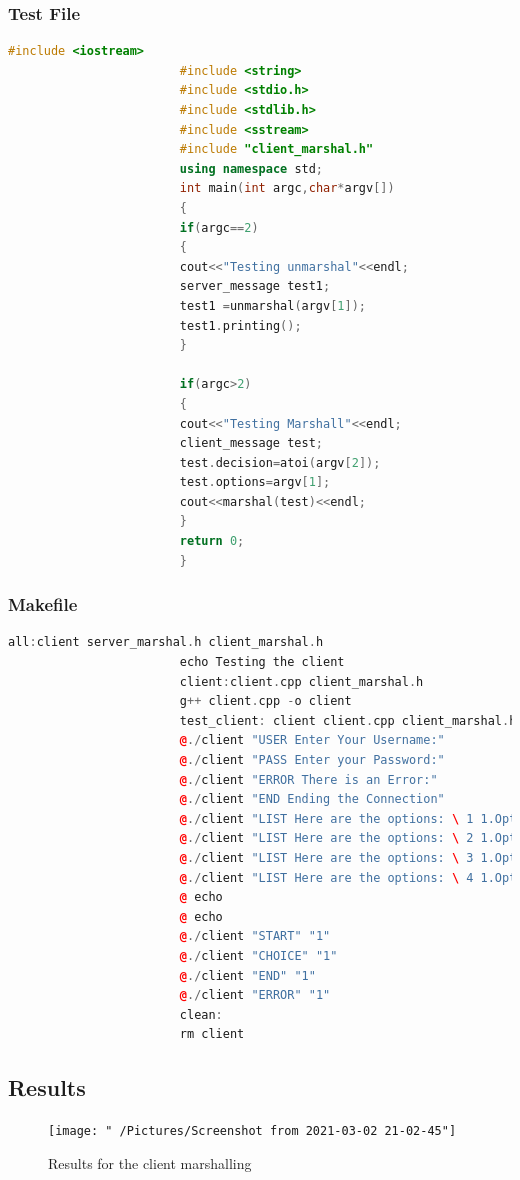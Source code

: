 \documentclass[11pt]{article}
\begin{document}
				\subsubsection{Test File}
					\begin{lstlisting}[language=C++]
						#include <iostream>
						#include <string>
						#include <stdio.h>
						#include <stdlib.h>
						#include <sstream>
						#include "client_marshal.h"
						using namespace std;
						int main(int argc,char*argv[])
						{
						if(argc==2)
						{
						cout<<"Testing unmarshal"<<endl;
						server_message test1;
						test1 =unmarshal(argv[1]);
						test1.printing();
						}
						
						if(argc>2)
						{
						cout<<"Testing Marshall"<<endl;
						client_message test;
						test.decision=atoi(argv[2]);
						test.options=argv[1];
						cout<<marshal(test)<<endl;
						}
						return 0;
						}
					\end{lstlisting}
				\subsubsection{Makefile}
					\begin{lstlisting}[language=C++]
						all:client server_marshal.h client_marshal.h
						echo Testing the client
						client:client.cpp client_marshal.h
						g++ client.cpp -o client				
						test_client: client client.cpp client_marshal.h
						@./client "USER Enter Your Username:"
						@./client "PASS Enter your Password:"
						@./client "ERROR There is an Error:"
						@./client "END Ending the Connection"
						@./client "LIST Here are the options: \ 1 1.Option 1 \\"
						@./client "LIST Here are the options: \ 2 1.Option 1 \ 2. Option 2 \\"
						@./client "LIST Here are the options: \ 3 1.Option 1 \ 2. Option 2 \ 3. Option 3 \\"
						@./client "LIST Here are the options: \ 4 1.Option 1 \ 2. Option 2 \ 3. Option 3 \ 4. Option 4 \\"
						@ echo
						@ echo
						@./client "START" "1"
						@./client "CHOICE" "1"
						@./client "END" "1"
						@./client "ERROR" "1"
						clean:
						rm client
					\end{lstlisting}
				\subsection{Results}	
					\begin{figure}[H]
						\centering
						\texttt{[image: "~/Pictures/Screenshot from 2021-03-02 21-02-45"]}
						\caption{Results for the client marshalling}
						\label{fig:screenshot-from-2021-03-02-21-02-45}
					\end{figure}
\end{document}
